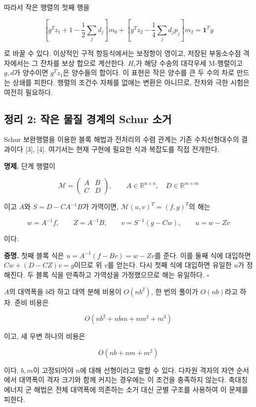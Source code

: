 \documentclass[
  10pt,
  a4paper,
]{article}
\begin{document}
따라서 작은 행렬의 첫째 행을

\[
\left[g^Tz_1+1-\frac12\sum_jd_j\right]m_0
+\left[g^Tz_2-\frac14\sum_jd_jp_j\right]m_2
=\mathbf1^Ty
\]

로 바꿀 수 있다. 이상적인 구적 항등식에서는 보정항이 영이고, 저장된
부동소수점 격자에서는 그 잔차를 보상 합으로 계산한다. \(H_i\)가 해당
수송의 대각우세 M-행렬이고 \(g,d\)가 양수이면 \(g^Tz_1\)은 양수들의
합이다. 이 표현은 작은 양수를 큰 두 수의 차로 만드는 상쇄를 피한다.
행렬의 조건수 자체를 없애는 변환은 아니므로, 잔차와 극한 시험은 여전히
필요하다.

\hypertarget{uxc815uxb9ac-2-uxc791uxc740-uxbb3cuxc9c8-uxacbduxacc4uxc758-schur-uxc18cuxac70}{%
\subsection{정리 2: 작은 물질 경계의 Schur
소거}\label{uxc815uxb9ac-2-uxc791uxc740-uxbb3cuxc9c8-uxacbduxacc4uxc758-schur-uxc18cuxac70}}

Schur 보완행렬을 이용한 블록 해법과 전처리의 수렴 관계는 기존
수치선형대수의 결과이다 {[}3{]}, {[}4{]}. 여기서는 현재 구현에 필요한
식과 복잡도를 직접 전개한다.

\textbf{명제.} 단계 행렬이

\[
\mathcal M=\begin{pmatrix}A&B\\C&D\end{pmatrix},
\qquad A\in\mathbb R^{n\times n},\quad D\in\mathbb R^{m\times m}
\]

이고 \(A\)와 \(S=D-CA^{-1}B\)가 가역이면,
\(\mathcal M(u,v)^T=(f,g)^T\)의 해는

\[
w=A^{-1}f,\qquad Z=A^{-1}B,
\qquad v=S^{-1}(g-Cw),\qquad u=w-Zv
\]

이다.

\textbf{증명.} 첫째 블록 식은 \(u=A^{-1}(f-Bv)=w-Zv\)를 준다. 이를 둘째
식에 대입하면 \(Cw+(D-CZ)v=g\)이므로 위 \(v\)를 얻는다. 다시 첫째 식에
대입하면 유일한 \(u\)가 정해진다. 두 블록 식을 만족하고 가역성을
가정했으므로 해는 유일하다. \(\square\)

\(A\)의 대역폭을 \(b\)라 하고 대역 분해 비용이 \(O(nb^2)\), 한 번의
풀이가 \(O(nb)\)라고 하자. 준비 비용은

\[
O(nb^2+nbm+nm^2+m^3)
\]

이고, 새 우변 하나의 비용은

\[
O(nb+nm+m^2)
\]

이다. \(b,m\)이 고정되어야 \(n\)에 대해 선형이라고 말할 수 있다. 다차원
격자의 자연 순서에서 대역폭이 격자 크기와 함께 커지는 경우에는 이 조건을
충족하지 않는다. 축대칭 에너지 군 해법은 전체 대역폭에 의존하는 소거
대신 군별 구조를 사용하여 이 문제를 피한다.
\end{document}
